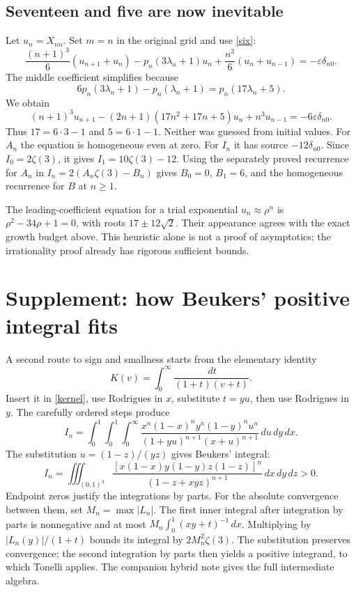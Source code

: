 \documentclass[11pt]{article}
\newcommand{\dd}{\,d}
\begin{document}
\subsection{Seventeen and five are now inevitable}
Let $u_n=X_{nn}$. Set $m=n$ in the original grid and use \eqref{six}:
\[
 \frac{(n+1)^3}{6}(u_{n+1}+u_n)
 -p_n(3\lambda_n+1)u_n+\frac{n^3}{6}(u_n+u_{n-1})
 =-\varepsilon\delta_{n0}.
\]
The middle coefficient simplifies because
\[
 6p_n(3\lambda_n+1)-p_n(\lambda_n+1)
       =p_n(17\lambda_n+5).
\]
We obtain
\begin{equation}\label{apery}
 \boxed{(n+1)^3u_{n+1}-(2n+1)(17n^2+17n+5)u_n+n^3u_{n-1}
 =-6\varepsilon\delta_{n0}.}
\end{equation}
Thus $17=6\cdot3-1$ and $5=6\cdot1-1$. Neither was guessed from initial values. For $A_n$ the equation is homogeneous even at zero. For $I_n$ it has source $-12\delta_{n0}$. Since $I_0=2\zeta(3)$, it gives $I_1=10\zeta(3)-12$. Using the separately proved recurrence for $A_n$ in $I_n=2(A_n\zeta(3)-B_n)$ gives $B_0=0$, $B_1=6$, and the homogeneous recurrence for $B$ at $n\ge1$.

The leading-coefficient equation for a trial exponential $u_n\approx\rho^n$ is $\rho^2-34\rho+1=0$, with roots $17\pm12\sqrt2$. Their appearance agrees with the exact growth budget above. This heuristic alone is not a proof of asymptotics; the irrationality proof already has rigorous sufficient bounds.

\section{Supplement: how Beukers' positive integral fits}
A second route to sign and smallness starts from the elementary identity
\[
 K(v)=\int_0^\infty\frac{\dd t}{(1+t)(v+t)}.
\]
Insert it in \eqref{kernel}, use Rodrigues in $x$, substitute $t=yu$, then use Rodrigues in $y$. The carefully ordered steps produce
\[
 I_n=\int_0^1\!\int_0^1\!\int_0^\infty
 \frac{x^n(1-x)^n y^n(1-y)^n u^n}
 {(1+yu)^{n+1}(x+u)^{n+1}}\dd u\dd y\dd x.
\]
The substitution $u=(1-z)/(yz)$ gives Beukers' integral:
\begin{equation}\label{beukers}
 I_n=\iiint_{(0,1)^3}
 \frac{[x(1-x)y(1-y)z(1-z)]^n}{(1-z+xyz)^{n+1}}
 \dd x\dd y\dd z>0.
\end{equation}
Endpoint zeros justify the integrations by parts. For the absolute convergence between them, set $M_n=\max|L_n|$. The first inner integral after integration by parts is nonnegative and at most $M_n\int_0^1(xy+t)^{-1}\dd x$. Multiplying by $|L_n(y)|/(1+t)$ bounds its integral by $2M_n^2\zeta(3)$. The substitution preserves convergence; the second integration by parts then yields a positive integrand, to which Tonelli applies. The companion hybrid note gives the full intermediate algebra.
\end{document}
